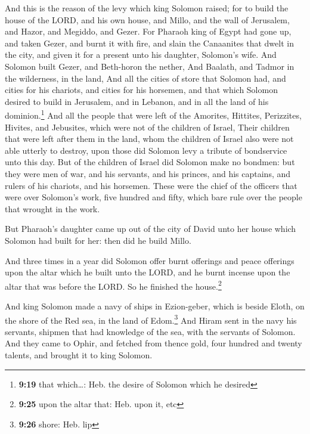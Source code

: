  And this is the reason of the levy which king Solomon
raised; for to build the house of the LORD, and his own house, and
Millo, and the wall of Jerusalem, and Hazor, and Megiddo, and Gezer.
 For Pharaoh king of Egypt had gone up, and taken Gezer,
and burnt it with fire, and slain the Canaanites that dwelt in the city,
and given it for a present unto his daughter, Solomon's wife.
 And Solomon built Gezer, and Beth-horon the nether,
 And Baalath, and Tadmor in the wilderness, in the land,
 And all the cities of store that Solomon had, and cities
for his chariots, and cities for his horsemen, and that which Solomon
desired to build in Jerusalem, and in Lebanon, and in all the land of
his dominion.\footnote{\textbf{9:19} that which\ldots: Heb. the desire
  of Solomon which he desired}  And all the people that
were left of the Amorites, Hittites, Perizzites, Hivites, and Jebusites,
which were not of the children of Israel,  Their children
that were left after them in the land, whom the children of Israel also
were not able utterly to destroy, upon those did Solomon levy a tribute
of bondservice unto this day.  But of the children of
Israel did Solomon make no bondmen: but they were men of war, and his
servants, and his princes, and his captains, and rulers of his chariots,
and his horsemen.  These were the chief of the officers
that were over Solomon's work, five hundred and fifty, which bare rule
over the people that wrought in the work.

 But Pharaoh's daughter came up out of the city of David
unto her house which Solomon had built for her: then did he build Millo.

 And three times in a year did Solomon offer burnt
offerings and peace offerings upon the altar which he built unto the
LORD, and he burnt incense upon the altar that was before the LORD. So
he finished the house.\footnote{\textbf{9:25} upon the altar that: Heb.
  upon it, etc}

 And king Solomon made a navy of ships in Ezion-geber,
which is beside Eloth, on the shore of the Red sea, in the land of
Edom.\footnote{\textbf{9:26} shore: Heb. lip}  And Hiram
sent in the navy his servants, shipmen that had knowledge of the sea,
with the servants of Solomon.  And they came to Ophir,
and fetched from thence gold, four hundred and twenty talents, and
brought it to king Solomon.

